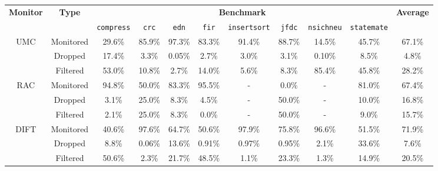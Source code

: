 

\begin{tabular}{|c|c|c|c|c|c|c|c|c|c|c|}
\hline

\multirow{2}{*}{\bf Monitor} & \multirow{2}{*}{\bf Type} & \multicolumn{8}{c|}{\bf Benchmark} & \multirow{2}{*}{\bf Average} \\ \cline{3-10}
 & & {\tt compress} & {\tt crc} & {\tt edn} & {\tt fir} & {\tt insertsort} & {\tt jfdc} & {\tt nsichneu} & {\tt statemate} & \\ \hline \hline

\multirow{3}{*}{UMC}
  & Monitored & 29.6\% & 85.9\% & 97.3\% & 83.3\% & 91.4\% & 88.7\% & 14.5\% & 45.7\% & 67.1\% \\ \cline{2-11}
   & Dropped & 17.4\% & 3.3\% & 0.05\% & 2.7\% & 3.0\% & 3.1\% & 0.10\% & 8.5\% & 4.8\% \\ \cline{2-11}
    & Filtered & 53.0\% & 10.8\% & 2.7\% & 14.0\% & 5.6\% & 8.3\% & 85.4\% & 45.8\% & 28.2\% \\

\hline
\hline

\multirow{3}{*}{RAC} 
 & Monitored & 94.8\% & 50.0\% & 83.3\% & 95.5\% & - & 0.0\% & - & 81.0\% & 67.4\% \\ \cline{2-11}
  & Dropped & 3.1\% & 25.0\% & 8.3\% & 4.5\% & - & 50.0\% & - & 10.0\% & 16.8\% \\ \cline{2-11}
   & Filtered & 2.1\% & 25.0\% & 8.3\% & 0.0\% & - & 50.0\% & - & 9.0\% & 15.7\% \\
 
\hline
\hline

\multirow{3}{*}{DIFT} 
 & Monitored & 40.6\% & 97.6\% & 64.7\% & 50.6\% & 97.9\% & 75.8\% & 96.6\% & 51.5\% & 71.9\% \\ \cline{2-11}
  & Dropped & 8.8\% & 0.06\% & 13.6\% & 0.91\% & 0.97\% & 0.95\% & 2.1\% & 33.6\% & 7.6\% \\ \cline{2-11}
   & Filtered & 50.6\% & 2.3\% & 21.7\% & 48.5\% & 1.1\% & 23.3\% & 1.3\% & 14.9\% & 20.5\% \\

\hline

\end{tabular}
